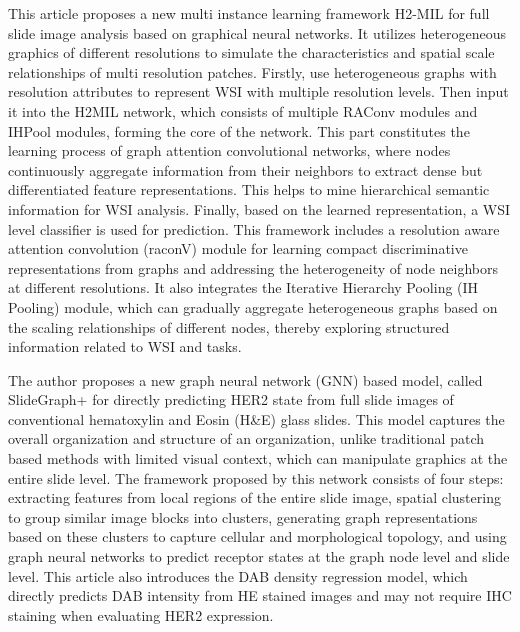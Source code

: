 \documentclass[journal,twoside,web]{ieeecolor}
\begin{document}
This article proposes a new multi instance learning framework H2-MIL\cite{hou2022h} for full slide image  analysis based on graphical neural networks. It utilizes heterogeneous graphics of different resolutions to simulate the characteristics and spatial scale relationships of multi resolution patches. Firstly, use heterogeneous graphs with resolution attributes to represent WSI with multiple resolution levels. Then input it into the H2MIL network, which consists of multiple RAConv modules and IHPool modules, forming the core of the network. This part constitutes the learning process of graph attention convolutional networks, where nodes continuously aggregate information from their neighbors to extract dense but differentiated feature representations. This helps to mine hierarchical semantic information for WSI analysis. Finally, based on the learned representation, a WSI level classifier is used for prediction. This framework includes a resolution aware attention convolution (raconV) module for learning compact discriminative representations from graphs and addressing the heterogeneity of node neighbors at different resolutions. It also integrates the Iterative Hierarchy Pooling (IH Pooling) module, which can gradually aggregate heterogeneous graphs based on the scaling relationships of different nodes, thereby exploring structured information related to WSI and tasks.




The author proposes a new graph neural network (GNN) based model, called SlideGraph+\cite{lu2022slidegraph+} for directly predicting HER2 state from full slide images of conventional hematoxylin and Eosin (H\&E) glass slides. This model captures the overall organization and structure of an organization, unlike traditional patch based methods with limited visual context, which can manipulate graphics at the entire slide level. The framework proposed by this network consists of four steps: extracting features from local regions of the entire slide image, spatial clustering to group similar image blocks into clusters, generating graph representations based on these clusters to capture cellular and morphological topology, and using graph neural networks to predict receptor states at the graph node level and slide level. This article also introduces the DAB density regression model, which directly predicts DAB intensity from HE stained images and may not require IHC staining when evaluating HER2 expression.
\end{document}
